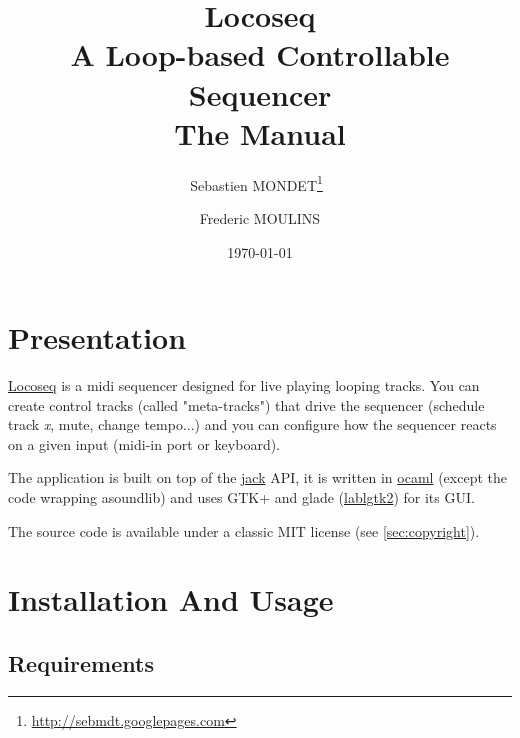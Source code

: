 

\title{
  \textbf{{\Huge Locoseq}\\
    A Loop-based Controllable Sequencer}\\
  The Manual}
\author{Sebastien MONDET\thanks{\url{http://sebmdt.googlepages.com}}\ \and
Frederic MOULINS}

\date{\today}






\maketitle
\tableofcontents

\newpage

\section{Presentation}

\href{http://locoseq.googlecode.com}{Locoseq} is a midi sequencer designed for
live playing looping tracks.  You can create control tracks (called
"meta-tracks") that drive the sequencer (schedule track \textit{x}, mute,
change tempo...) and you can configure how the sequencer reacts on a given
input (midi-in port or keyboard).


The application is built on top of the \href{http://jackaudio.org/}{jack}
API, it is written in
\href{http://www.ocaml.org}{ocaml}
(except the code wrapping asoundlib) and uses GTK+ and glade
(\href {http://wwwfun.kurims.kyoto-u.ac.jp/soft/lsl/lablgtk.html}{lablgtk2})
for its GUI.

The source code is available under a classic MIT license (see
\ref{sec:copyright}).



\section{Installation And Usage}

\subsection{Requirements}


